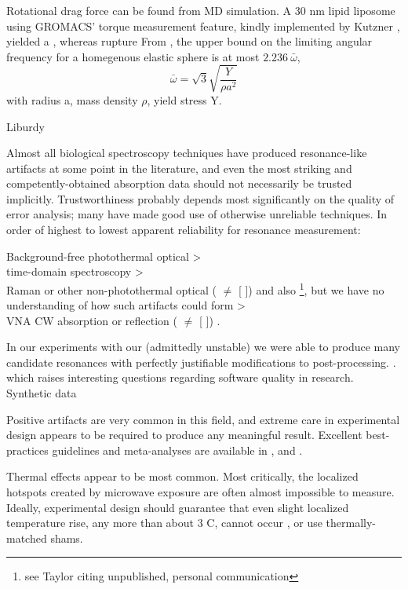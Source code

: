 \documentclass[paper.tex]{subfiles}
\begin{document}
Rotational drag force can be found from MD simulation\cite{Evaluating2017}. A 30 nm lipid liposome using GROMACS' torque measurement feature, kindly implemented by Kutzner \cite{Keep2011}, yielded a , whereas rupture From \cite{Spinning2008}, the upper bound on the limiting angular frequency for a homegenous elastic sphere is at most $2.236 \ \bar \omega$, $$\bar \omega = \sqrt{3}\sqrt{\frac{Y}{\rho a^2}}$$ with radius a, mass density $\rho$, yield stress Y.

Liburdy

Almost all biological spectroscopy techniques have produced resonance-like artifacts at some point in the literature, and even the most striking and competently-obtained absorption data should not necessarily be trusted implicitly. Trustworthiness probably depends most significantly on the quality of error analysis; many have made good use of otherwise unreliable techniques. In order of highest to lowest apparent reliability for resonance measurement:

Background-free photothermal optical \cite{Microwave1993a}\cite{Broadband1988} >\\ time-domain spectroscopy\cite{Time2003}\cite{Dielectric2004}\cite{Microwave1994} >\\ Raman or other non-photothermal optical (\cite{optical1983} $\neq$ [\cite{Resonances1987} \cite{Dielectric1989}]) and also \footnote{see Taylor \cite{mechanisms1981} citing unpublished, personal communication}, but we have no understanding of how such artifacts could form >\\ VNA CW absorption or reflection (\cite{Microwave1982} $\neq$ [\cite{Resonances1987} \cite{Dielectric1989}]) \cite{Substitution1982} \cite{Millimeter1980}.

In our experiments with our (admittedly unstable) we were able to produce many candidate resonances with perfectly justifiable modifications to post-processing. \cite{Reanalysis2020}\cite{statistical2020}. which raises interesting questions regarding software quality in research. Synthetic data 

Positive artifacts are very common in this field, and extreme care in experimental design appears to be required to produce any meaningful result. Excellent best-practices guidelines and meta-analyses are available in \cite{Biological2016} \cite{Comprehensive2018} \cite{Funding2019}, \cite{chou1996radio} and \cite{Effects2016}.

Thermal effects appear to be most common. Most critically, the localized hotspots created by microwave exposure are often almost impossible to measure. Ideally, experimental design should guarantee that even slight localized temperature rise, any more than about 3 C, cannot occur \cite{Sharp1983}\cite{DNA2004}, or use thermally-matched shams\cite{Basic1983}. \cite{Effects1951}
\end{document}
